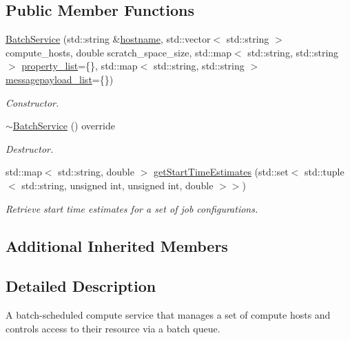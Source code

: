 \subsection*{Public Member Functions}
\begin{DoxyCompactItemize}
\item 
\hyperlink{classwrench_1_1_batch_service_a2f91405c977001fa52acda0fe849f143}{Batch\+Service} (std\+::string \&\hyperlink{classwrench_1_1_s4_u___daemon_a52bc0b9a6cd248310749dac086819f00}{hostname}, std\+::vector$<$ std\+::string $>$ compute\+\_\+hosts, double scratch\+\_\+space\+\_\+size, std\+::map$<$ std\+::string, std\+::string $>$ \hyperlink{classwrench_1_1_service_a032143b1e2d7296dde9b4ca1e34845ce}{property\+\_\+list}=\{\}, std\+::map$<$ std\+::string, std\+::string $>$ \hyperlink{classwrench_1_1_service_a63865f20c92027ab626ab1347b0099d2}{messagepayload\+\_\+list}=\{\})
\begin{DoxyCompactList}\small\item\em Constructor. \end{DoxyCompactList}\item 
\mbox{\label{classwrench_1_1_batch_service_a9963031d12518fba9f22e927a87f1dea}} 
\hyperlink{classwrench_1_1_batch_service_a9963031d12518fba9f22e927a87f1dea}{$\sim$\+Batch\+Service} () override
\begin{DoxyCompactList}\small\item\em Destructor. \end{DoxyCompactList}\item 
std\+::map$<$ std\+::string, double $>$ \hyperlink{classwrench_1_1_batch_service_aef66984e61f6d36276ee8ae38ece8266}{get\+Start\+Time\+Estimates} (std\+::set$<$ std\+::tuple$<$ std\+::string, unsigned int, unsigned int, double $>$$>$)
\begin{DoxyCompactList}\small\item\em Retrieve start time estimates for a set of job configurations. \end{DoxyCompactList}\end{DoxyCompactItemize}
\subsection*{Additional Inherited Members}


\subsection{Detailed Description}
A batch-\/scheduled compute service that manages a set of compute hosts and controls access to their resource via a batch queue. 

